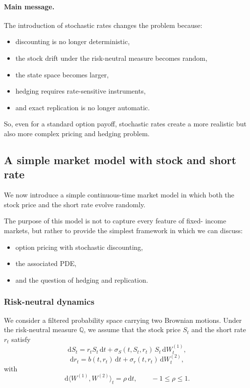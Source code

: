 \documentclass[11pt]{article}
\newcommand{\Qbb}{\mathbb{Q}}
\theoremstyle{plain}
\theoremstyle{definition}
\theoremstyle{remark}
\begin{document}
\paragraph{Main message.}
The introduction of stochastic rates changes the problem because:
\begin{itemize}[leftmargin=1.4em]
    \item discounting is no longer deterministic,
    \item the stock drift under the risk-neutral measure becomes random,
    \item the state space becomes larger,
    \item hedging requires rate-sensitive instruments,
    \item and exact replication is no longer automatic.
\end{itemize}

So, even for a standard option payoff, stochastic rates create a more
realistic but also more complex pricing and hedging problem.

\subsection{A simple market model with stock and short rate}

We now introduce a simple continuous-time market model in which both the
stock price and the short rate evolve randomly.

The purpose of this model is not to capture every feature of fixed-
income markets, but rather to provide the simplest framework in which we
can discuss:
\begin{itemize}[leftmargin=1.4em]
    \item option pricing with stochastic discounting,
    \item the associated PDE,
    \item and the question of hedging and replication.
\end{itemize}

\subsubsection{Risk-neutral dynamics}

We consider a filtered probability space carrying two Brownian motions.
Under the risk-neutral measure \(\Qbb\), we assume that the stock price
\(S_t\) and the short rate \(r_t\) satisfy
\[
\mathrm{d}S_t
=
r_tS_t\,\mathrm{d}t
+
\sigma_S(t,S_t,r_t)\,S_t\,\mathrm{d}W_t^{(1)},
\]
\[
\mathrm{d}r_t
=
b(t,r_t)\,\mathrm{d}t
+
\sigma_r(t,r_t)\,\mathrm{d}W_t^{(2)},
\]
with
\[
\mathrm{d}\langle W^{(1)},W^{(2)}\rangle_t=\rho\,\mathrm{d}t,
\qquad -1\le \rho\le 1.
\]
\end{document}
